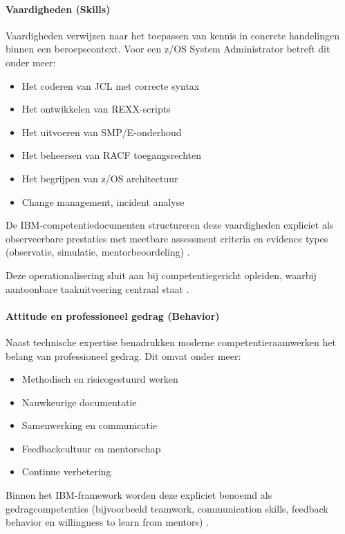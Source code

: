 \paragraph{Vaardigheden (Skills)}

Vaardigheden verwijzen naar het toepassen van kennis in concrete handelingen binnen een beroepscontext. Voor een z/OS System Administrator betreft dit onder meer:

\begin{itemize}
	\item Het coderen van JCL met correcte syntax
	\item Het ontwikkelen van REXX-scripts
	\item Het uitvoeren van SMP/E-onderhoud
	\item Het beheersen van RACF toegangsrechten
	\item Het begrijpen van z/OS architectuur
	\item Change management, incident analyse
\end{itemize}

De IBM-competentiedocumenten structureren deze vaardigheden expliciet als observeerbare prestaties met meetbare assessment criteria en evidence types (observatie, simulatie, mentorbeoordeling) \autocite{ibm_level1_framework,ibm_level2_framework}.  

Deze operationalisering sluit aan bij competentiegericht opleiden, waarbij aantoonbare taakuitvoering centraal staat \autocite{mulder2014competence}.

\paragraph{Attitude en professioneel gedrag (Behavior)}

Naast technische expertise benadrukken moderne competentieraamwerken het belang van professioneel gedrag. Dit omvat onder meer:

\begin{itemize}
	\item Methodisch en risicogestuurd werken
	\item Nauwkeurige documentatie
	\item Samenwerking en communicatie
	\item Feedbackcultuur en mentorschap
	\item Continue verbetering
\end{itemize}

Binnen het IBM-framework worden deze expliciet benoemd als gedragcompetenties (bijvoorbeeld teamwork, communication skills, feedback behavior en willingness to learn from mentors) \autocite{ibm_level1_framework}.  

